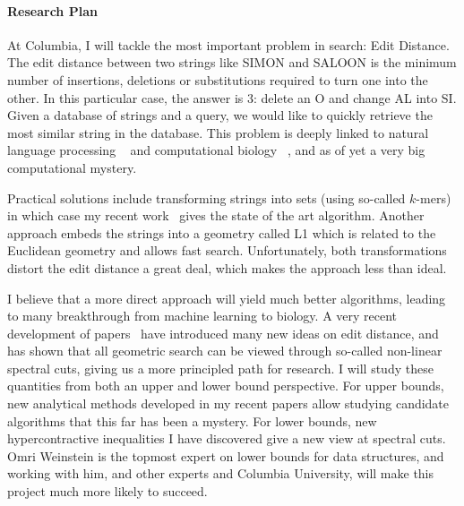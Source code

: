 \documentclass[10pt]{article}
\begin{document}

\paragraph{Research Plan}

At Columbia, I will tackle the most important problem in search: Edit Distance.
The edit distance between two strings like SIMON and SALOON is the minimum number of insertions, deletions or substitutions required to turn one into the other.
In this particular case, the answer is 3: delete an O and change AL into SI.
Given a database of strings and a query, we would like to quickly retrieve the most similar string in the database.
This problem is deeply linked to natural language processing
~\cite{sidorov2015computing}
and computational biology
~\cite{mcgrane2016biological},
and as of yet a very big computational mystery.

Practical solutions include transforming strings into sets (using so-called $k$-mers) in which case my recent work~\cite{ahle2019subsets} gives the state of the art algorithm.
Another approach embeds the strings into a geometry called L1
which is related to the Euclidean geometry and allows fast search.
Unfortunately, both transformations distort the edit distance a great deal, which makes the approach less than ideal.

I believe that a more direct approach will yield much better algorithms, leading to many breakthrough from machine learning to biology.
A very recent development of papers~\cite{
   chakraborty2018approximating,
   haeupler2019near%
}
have introduced many new ideas on edit distance,
and~\cite{andoni2018data} has shown that all geometric search can be viewed through so-called non-linear spectral cuts, giving us a more principled path for research.
I will study these quantities from both an upper and lower bound perspective.
For upper bounds, new analytical methods developed in my recent papers allow studying candidate algorithms that this far has been a mystery.
For lower bounds, new hypercontractive inequalities I have discovered give a new view at spectral cuts.
Omri Weinstein is the topmost expert on lower bounds for data structures, and working with him, and other experts and Columbia University, will make this project much more likely to succeed.

\clearpage
\phantom{,}
\vspace{1cm}


\end{document}
